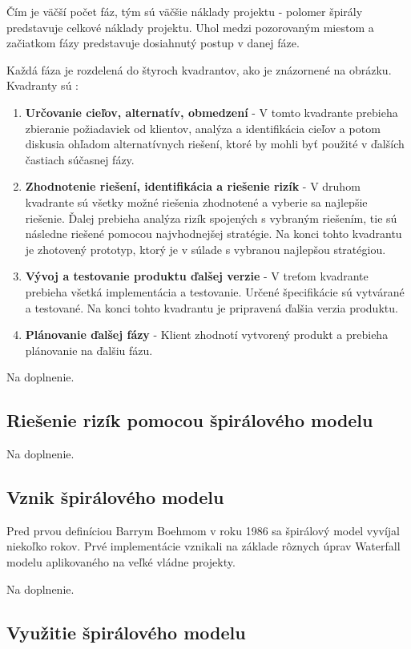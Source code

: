 \documentclass[10pt,twoside,slovak,a4paper]{article}
\begin{document}
Čím je väčší počet fáz, tým sú väčšie náklady projektu - polomer špirály predstavuje celkové náklady projektu. Uhol medzi pozorovaným miestom a začiatkom fázy predstavuje dosiahnutý postup v danej fáze. \cite{SpiralModelDef1}

Každá fáza je rozdelená do štyroch kvadrantov, ako je znázornené na obrázku. Kvadranty sú \cite{SpiralModelDef1}:
\begin{enumerate}
\item \textbf{Určovanie cieľov, alternatív, obmedzení } - V tomto kvadrante prebieha zbieranie požiadaviek od klientov, analýza a identifikácia cieľov a potom diskusia ohľadom alternatívnych riešení, ktoré by mohli byť použité v ďalších častiach súčasnej fázy.
\item \textbf{Zhodnotenie riešení, identifikácia a riešenie rizík } - V druhom kvadrante sú všetky možné riešenia zhodnotené a vyberie sa najlepšie riešenie. Ďalej prebieha analýza rizík spojených s vybraným riešením, tie sú následne riešené pomocou najvhodnejšej stratégie. Na konci tohto kvadrantu je zhotovený prototyp, ktorý je v súlade s vybranou najlepšou stratégiou.
\item \textbf{Vývoj a testovanie produktu ďalšej verzie} - V treťom kvadrante prebieha všetká implementácia a testovanie. Určené špecifikácie sú vytvárané a testované. Na konci tohto kvadrantu je pripravená ďalšia verzia produktu.
\item \textbf{Plánovanie ďalšej fázy} - Klient zhodnotí vytvorený produkt a prebieha plánovanie na ďalšiu fázu.
\end{enumerate}
Na doplnenie.

\subsection{Riešenie rizík pomocou špirálového modelu} \label{risks:spiralModel}

Na doplnenie.

\subsection{Vznik špirálového modelu} \label{history:spiralModel}
Pred prvou definíciou Barrym Boehmom v roku 1986 sa špirálový model vyvíjal niekoľko rokov. Prvé implementácie vznikali na základe rôznych úprav Waterfall modelu aplikovaného na veľké vládne projekty. \cite{Boehm}

Na doplnenie.

\subsection{Využitie špirálového modelu} \label{usage:spiralModel}
\end{document}
